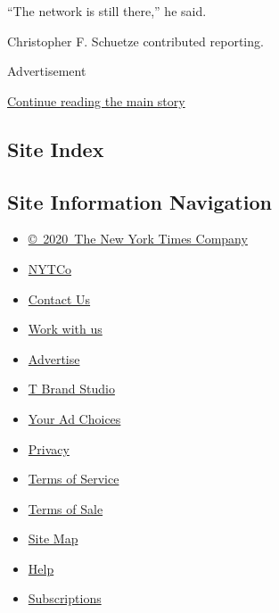 ``The network is still there,'' he said.

Christopher F. Schuetze contributed reporting.

Advertisement

\protect\hyperlink{after-bottom}{Continue reading the main story}

\hypertarget{site-index}{%
\subsection{Site Index}\label{site-index}}

\hypertarget{site-information-navigation}{%
\subsection{Site Information
Navigation}\label{site-information-navigation}}

\begin{itemize}
\tightlist
\item
  \href{https://help.nytimes3xbfgragh.onion/hc/en-us/articles/115014792127-Copyright-notice}{©~2020~The
  New York Times Company}
\end{itemize}

\begin{itemize}
\tightlist
\item
  \href{https://www.nytco.com/}{NYTCo}
\item
  \href{https://help.nytimes3xbfgragh.onion/hc/en-us/articles/115015385887-Contact-Us}{Contact
  Us}
\item
  \href{https://www.nytco.com/careers/}{Work with us}
\item
  \href{https://nytmediakit.com/}{Advertise}
\item
  \href{http://www.tbrandstudio.com/}{T Brand Studio}
\item
  \href{https://www.nytimes3xbfgragh.onion/privacy/cookie-policy\#how-do-i-manage-trackers}{Your
  Ad Choices}
\item
  \href{https://www.nytimes3xbfgragh.onion/privacy}{Privacy}
\item
  \href{https://help.nytimes3xbfgragh.onion/hc/en-us/articles/115014893428-Terms-of-service}{Terms
  of Service}
\item
  \href{https://help.nytimes3xbfgragh.onion/hc/en-us/articles/115014893968-Terms-of-sale}{Terms
  of Sale}
\item
  \href{https://spiderbites.nytimes3xbfgragh.onion}{Site Map}
\item
  \href{https://help.nytimes3xbfgragh.onion/hc/en-us}{Help}
\item
  \href{https://www.nytimes3xbfgragh.onion/subscription?campaignId=37WXW}{Subscriptions}
\end{itemize}
